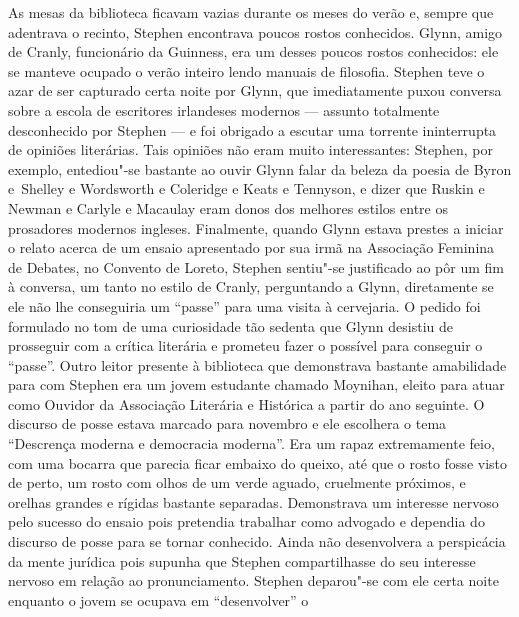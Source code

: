 As mesas da biblioteca ficavam vazias durante os meses do verão e, sempre que
adentrava o recinto, Stephen encontrava poucos rostos conhecidos.
Glynn, amigo de Cranly, funcionário da Guinness, era um desses
poucos rostos conhecidos: ele se manteve ocupado o verão inteiro lendo \mbox{manuais}
de filosofia.  Stephen teve o azar de ser capturado certa noite por
Glynn, que imediatamente puxou conversa sobre a escola de escritores irlandeses
modernos --- assunto totalmente desconhecido por Stephen --- e foi obrigado a
escutar uma torrente ininterrupta de opiniões literárias.  Tais opiniões não
eram muito interessantes: Stephen, por exemplo, entediou"-se bastante ao ouvir
Glynn falar da beleza da poesia de Byron \mbox{e Shelley} e Wordsworth e		
Coleridge e Keats e Tennyson, e dizer que Ruskin e Newman e Carlyle e Macaulay
eram donos dos melhores estilos entre os prosadores modernos ingleses.
Finalmente, quando Glynn estava prestes a iniciar o relato acerca de
um ensaio apresentado por sua irmã na Associação Feminina de Debates, no
Convento de Loreto, Stephen sentiu"-se justificado ao pôr um fim à conversa, \label{um"-tanto} um
tanto no estilo de Cranly, perguntando a Glynn, diretamente se ele
não lhe conseguiria um “passe” para uma visita à cervejaria.  O pedido foi
formulado no tom de uma curiosidade tão sedenta que Glynn desistiu de
prosseguir com a crítica literária e prometeu fazer o possível para conseguir o
“passe”.  Outro leitor presente à biblioteca que demonstrava bastante
amabilidade para com Stephen era um jovem estudante chamado Moynihan, eleito
para atuar como Ouvidor da Associação Literária e Histórica a partir do ano
seguinte.  O discurso de posse estava marcado para novembro e ele escolhera o
tema “Descrença moderna e democracia moderna”.  Era um rapaz extremamente
feio, com uma bocarra que parecia ficar embaixo do queixo, até que o
rosto fosse visto de perto, um rosto com olhos de um verde aguado, cruelmente
próximos, e orelhas grandes e rígidas bastante separadas.  Demonstrava um
interesse nervoso pelo sucesso do ensaio pois pretendia trabalhar como advogado
e dependia do discurso de posse para se tornar conhecido.  Ainda não
desenvolvera a perspicácia da mente jurídica pois supunha que Stephen
compartilhasse do seu interesse nervoso em relação ao pronunciamento.  Stephen
deparou"-se com ele certa noite enquanto o jovem se ocupava em “desenvolver” o
